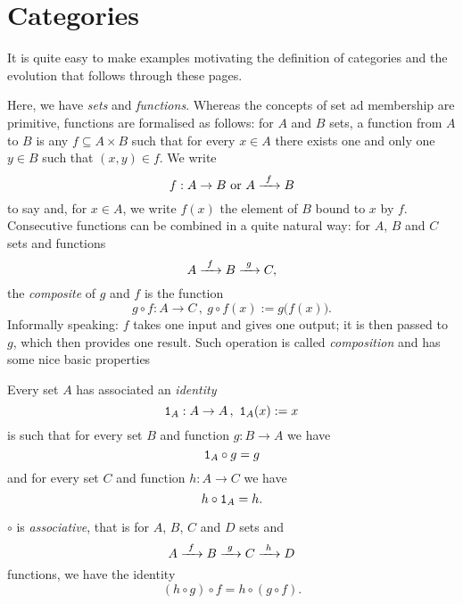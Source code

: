 
\section{Categories}

It is quite easy to make examples motivating the definition of categories and the evolution that follows through these pages.

\begin{example}
Here, we have {\em sets} and {\em functions}. Whereas the concepts of set ad membership are primitive, functions are formalised as follows: for \(A\) and \(B\) sets, a function from \(A\) to \(B\) is any \(f \subseteq A \times B\) such that for every \(x \in A\) there exists one and only one \(y \in B\) such that \((x, y ) \in f\). We write
\[f : A \to B \ \text{or} \ A \xrightarrow{\ f\ } B\]
to say  and, for \(x \in A\), we write \(f(x)\) the element of \(B\) bound to \(x\) by \(f\). Consecutive functions can be combined in a quite natural way: for \(A\), \(B\) and \(C\) sets and functions
\[A \xrightarrow{\ f\ } B \xrightarrow{\ g\ } C ,\]
the {\em composite} of \(g\) and \(f\) is the function
\[g \circ f : A \to C \,,\ g \circ f(x) := g\big(f(x)\big) .\]
Informally speaking: \(f\) takes one input and gives one output; it is then passed to \(g\), which then provides one result. Such operation is called {\em composition} and has some nice basic properties
\begin{tcbenum}
\item Every set \(A\) has associated an {\em identity}
\[\mathtt 1_A : A \to A \,,\ \mathtt 1_A (x) := x\]
is such that for every set \(B\) and function \(g : B \to A\) we have
\[\mathtt 1_A \circ g = g\]
and for every set \(C\) and function \(h : A \to C\) we have
\[h \circ \mathtt 1_A = h .\]
\item \(\circ\) is {\em associative}, that is for \(A\), \(B\), \(C\) and \(D\) sets and
\[A \xrightarrow{\ f\ } B \xrightarrow{\ g\ } C \xrightarrow{\ h\ } D\]
functions, we have the identity
\[(h \circ g) \circ f = h \circ (g \circ f) .\]
\end{tcbenum}
\end{example}

